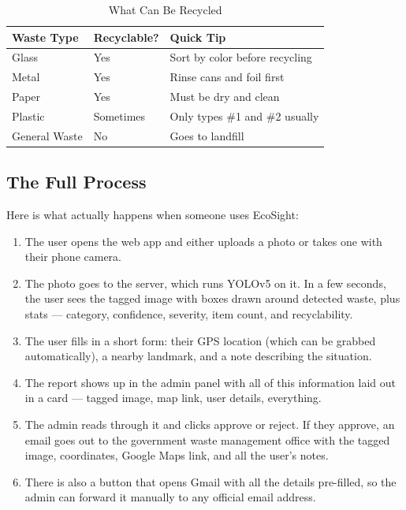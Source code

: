 \documentclass[conference]{IEEEtran}
\begin{document}
\begin{table}[H]
\centering
\caption{What Can Be Recycled}
\label{tab:recyclability}
\begin{tabular}{@{}lll@{}}
\toprule
\textbf{Waste Type} & \textbf{Recyclable?} & \textbf{Quick Tip} \\
\midrule
Glass & Yes & Sort by color before recycling \\
Metal & Yes & Rinse cans and foil first \\
Paper & Yes & Must be dry and clean \\
Plastic & Sometimes & Only types \#1 and \#2 usually \\
General Waste & No & Goes to landfill \\
\bottomrule
\end{tabular}
\end{table}

\subsection{The Full Process}
Here is what actually happens when someone uses EcoSight:

\begin{enumerate}[leftmargin=*]
    \item The user opens the web app and either uploads a photo or takes one with their phone camera.
    \item The photo goes to the server, which runs YOLOv5 on it. In a few seconds, the user sees the tagged image with boxes drawn around detected waste, plus stats — category, confidence, severity, item count, and recyclability.
    \item The user fills in a short form: their GPS location (which can be grabbed automatically), a nearby landmark, and a note describing the situation.
    \item The report shows up in the admin panel with all of this information laid out in a card — tagged image, map link, user details, everything.
    \item The admin reads through it and clicks approve or reject. If they approve, an email goes out to the government waste management office with the tagged image, coordinates, Google Maps link, and all the user's notes.
    \item There is also a button that opens Gmail with all the details pre-filled, so the admin can forward it manually to any official email address.
\end{enumerate}
\end{document}
